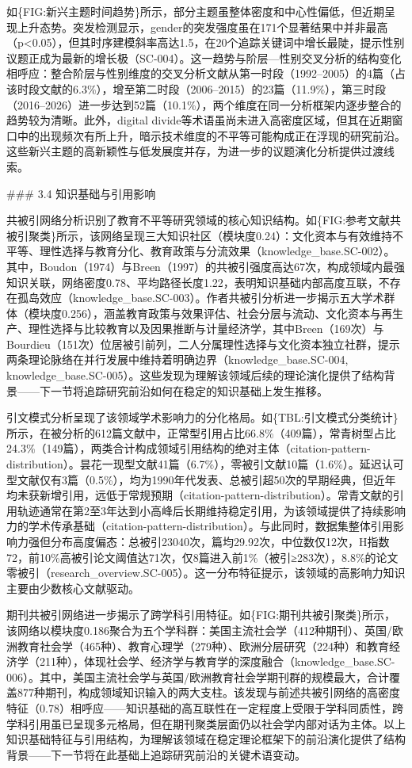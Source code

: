 \documentclass[12pt,a4paper]{article}
\begin{document}
如\{FIG:新兴主题时间趋势\}所示，部分主题虽整体密度和中心性偏低，但近期呈现上升态势。突发检测显示，gender的突发强度虽在171个显著结果中并非最高（p<0.05），但其时序建模斜率高达1.5，在20个追踪关键词中增长最陡，提示性别议题正成为最新的增长极（SC-004）。这一趋势与阶层—性别交叉分析的结构变化相呼应：整合阶层与性别维度的交叉分析文献从第一时段（1992–2005）的4篇（占该时段文献的6.3\%），增至第二时段（2006–2015）的23篇（11.9\%），第三时段（2016–2026）进一步达到52篇（10.1\%），两个维度在同一分析框架内逐步整合的趋势较为清晰。此外，digital divide等术语虽尚未进入高密度区域，但其在近期窗口中的出现频次有所上升，暗示技术维度的不平等可能构成正在浮现的研究前沿。这些新兴主题的高新颖性与低发展度并存，为进一步的议题演化分析提供过渡线索。

\#\#\# 3.4 知识基础与引用影响

共被引网络分析识别了教育不平等研究领域的核心知识结构。如\{FIG:参考文献共被引聚类\}所示，该网络呈现三大知识社区（模块度0.24）：文化资本与有效维持不平等、理性选择与教育分化、教育政策与分流效果（knowledge\_base.SC-002）。其中，Boudon（1974）与Breen（1997）的共被引强度高达67次，构成领域内最强知识关联，网络密度0.78、平均路径长度1.22，表明知识基础内部高度互联，不存在孤岛效应（knowledge\_base.SC-003）。作者共被引分析进一步揭示五大学术群体（模块度0.256），涵盖教育政策与效果评估、社会分层与流动、文化资本与再生产、理性选择与比较教育以及因果推断与计量经济学，其中Breen（169次）与Bourdieu（151次）位居被引前列，二人分属理性选择与文化资本独立社群，提示两条理论脉络在并行发展中维持着明确边界（knowledge\_base.SC-004, knowledge\_base.SC-005）。这些发现为理解该领域后续的理论演化提供了结构背景——下一节将追踪研究前沿如何在稳定的知识基础上发生推移。

引文模式分析呈现了该领域学术影响力的分化格局。如\{TBL:引文模式分类统计\}所示，在被分析的612篇文献中，正常型引用占比66.8\%（409篇），常青树型占比24.3\%（149篇），两类合计构成领域引用结构的绝对主体（citation-pattern-distribution）。昙花一现型文献41篇（6.7\%），零被引文献10篇（1.6\%）。延迟认可型文献仅有3篇（0.5\%），均为1990年代发表、总被引超50次的早期经典，但近年均未获新增引用，远低于常规预期（citation-pattern-distribution）。常青文献的引用轨迹通常在第2至3年达到小高峰后长期维持稳定引用，为该领域提供了持续影响力的学术传承基础（citation-pattern-distribution）。与此同时，数据集整体引用影响力强但分布高度偏态：总被引23040次，篇均29.92次，中位数仅12次，H指数72，前10\%高被引论文阈值达71次，仅8篇进入前1\%（被引≥283次），8.8\%的论文零被引（research\_overview.SC-005）。这一分布特征提示，该领域的高影响力知识主要由少数核心文献驱动。

期刊共被引网络进一步揭示了跨学科引用特征。如\{FIG:期刊共被引聚类\}所示，该网络以模块度0.186聚合为五个学科群：美国主流社会学（412种期刊）、英国/欧洲教育社会学（465种）、教育心理学（279种）、欧洲分层研究（224种）和教育经济学（211种），体现社会学、经济学与教育学的深度融合（knowledge\_base.SC-006）。其中，美国主流社会学与英国/欧洲教育社会学期刊群的规模最大，合计覆盖877种期刊，构成领域知识输入的两大支柱。该发现与前述共被引网络的高密度特征（0.78）相呼应——知识基础的高互联性在一定程度上受限于学科同质性，跨学科引用虽已呈现多元格局，但在期刊聚类层面仍以社会学内部对话为主体。以上知识基础特征与引用结构，为理解该领域在稳定理论框架下的前沿演化提供了结构背景——下一节将在此基础上追踪研究前沿的关键术语变动。
\end{document}
